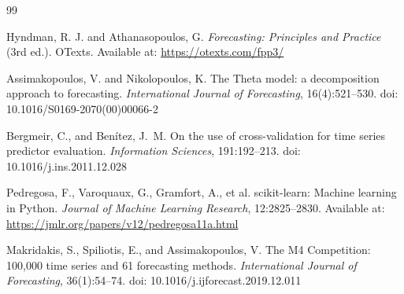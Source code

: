 \documentclass[12pt,a4paper]{article}
\begin{document}
\begin{thebibliography}{99}

Hyndman, R. J. and Athanasopoulos, G.
\newblock \textit{Forecasting: Principles and Practice} (3rd ed.).
\newblock OTexts.
\newblock Available at: \url{https://otexts.com/fpp3/}

Assimakopoulos, V. and Nikolopoulos, K.
\newblock The Theta model: a decomposition approach to forecasting.
\newblock \textit{International Journal of Forecasting}, 16(4):521--530.
\newblock doi: 10.1016/S0169-2070(00)00066-2

Bergmeir, C., and Ben\'itez, J.~M.
\newblock On the use of cross-validation for time series predictor evaluation.
\newblock \textit{Information Sciences}, 191:192--213.
\newblock doi: 10.1016/j.ins.2011.12.028

Pedregosa, F., Varoquaux, G., Gramfort, A., et al.
\newblock scikit-learn: Machine learning in Python.
\newblock \textit{Journal of Machine Learning Research}, 12:2825--2830.
\newblock Available at: \url{https://jmlr.org/papers/v12/pedregosa11a.html}

Makridakis, S., Spiliotis, E., and Assimakopoulos, V.
\newblock The M4 Competition: 100,000 time series and 61 forecasting methods.
\newblock \textit{International Journal of Forecasting}, 36(1):54--74.
\newblock doi: 10.1016/j.ijforecast.2019.12.011

\end{thebibliography}
\end{document}
